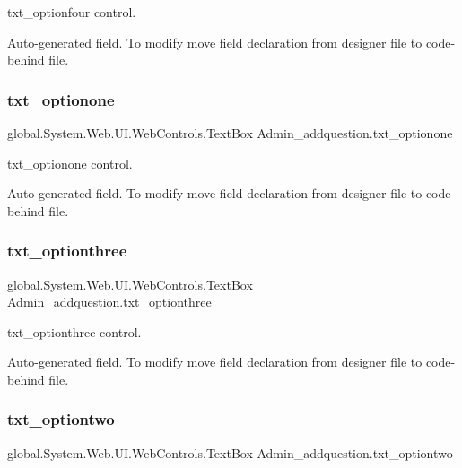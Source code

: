 txt\+\_\+optionfour control. 

Auto-\/generated field. To modify move field declaration from designer file to code-\/behind file. \mbox{\label{class_admin__addquestion_a673030a0910c338eef0fbf42646fcbcd}} 
\subsubsection{\texorpdfstring{txt\_optionone}{txt\_optionone}}
{\footnotesize\ttfamily global.\+System.\+Web.\+U\+I.\+Web\+Controls.\+Text\+Box Admin\+\_\+addquestion.\+txt\+\_\+optionone\hspace{0.3cm}{\ttfamily [protected]}}



txt\+\_\+optionone control. 

Auto-\/generated field. To modify move field declaration from designer file to code-\/behind file. \mbox{\label{class_admin__addquestion_a2898d0b950e799a92fa0bd1840a28486}} 
\subsubsection{\texorpdfstring{txt\_optionthree}{txt\_optionthree}}
{\footnotesize\ttfamily global.\+System.\+Web.\+U\+I.\+Web\+Controls.\+Text\+Box Admin\+\_\+addquestion.\+txt\+\_\+optionthree\hspace{0.3cm}{\ttfamily [protected]}}



txt\+\_\+optionthree control. 

Auto-\/generated field. To modify move field declaration from designer file to code-\/behind file. \mbox{\label{class_admin__addquestion_ac31566c7beee0616f6b351a5dfa0d288}} 
\subsubsection{\texorpdfstring{txt\_optiontwo}{txt\_optiontwo}}
{\footnotesize\ttfamily global.\+System.\+Web.\+U\+I.\+Web\+Controls.\+Text\+Box Admin\+\_\+addquestion.\+txt\+\_\+optiontwo\hspace{0.3cm}{\ttfamily [protected]}}



